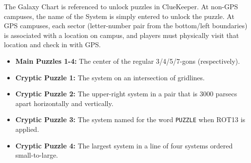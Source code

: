 The Galaxy Chart is referenced to unlock puzzles in ClueKeeper.
At non-GPS campuses, the name of the System is simply entered to
unlock the puzzle. At GPS campuses, each sector (letter-number pair
from the bottom/left boundaries) is associated with a location on
campus, and players must physically visit that location and check
in with GPS. 

\begin{itemize}
\item
  \textbf{Main Puzzles 1-4:} The center of the regular 3/4/5/7-gons (respectively).
\item
  \textbf{Cryptic Puzzle 1:} The system on an intersection of gridlines.
\item
  \textbf{Cryptic Puzzle 2:} The upper-right system in a pair that is 3000 parsecs
  apart horizontally and vertically. 
\item
  \textbf{Cryptic Puzzle 3:} The system named for the word \texttt{PUZZLE} when
  ROT13 is applied. 
\item
  \textbf{Cryptic Puzzle 4:} The largest system in a line of four systems ordered small-to-large. 
\end{itemize} 

